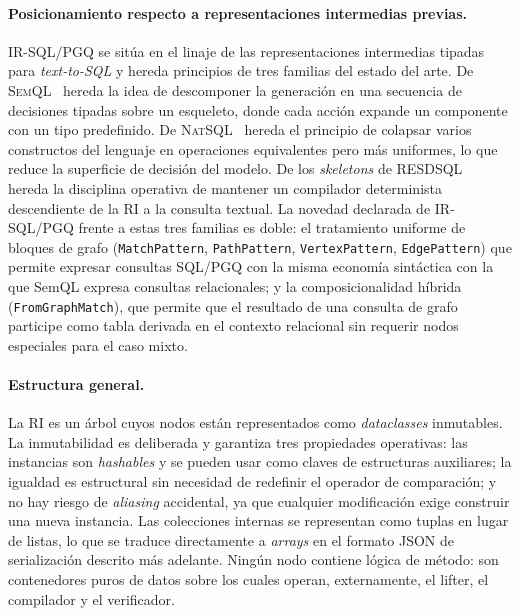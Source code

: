 \paragraph{Posicionamiento respecto a representaciones intermedias previas.} IR-SQL/PGQ se sitúa en el linaje de las representaciones intermedias tipadas para \emph{text-to-SQL} y hereda principios de tres familias del estado del arte. De \textsc{SemQL}~\cite{guo2019irnet} hereda la idea de descomponer la generación en una secuencia de decisiones tipadas sobre un esqueleto, donde cada acción expande un componente con un tipo predefinido. De \textsc{NatSQL}~\cite{gan2021natsql} hereda el principio de colapsar varios constructos del lenguaje en operaciones equivalentes pero más uniformes, lo que reduce la superficie de decisión del modelo. De los \emph{skeletons} de \textsc{RESDSQL}~\cite{RESDSQL2023} hereda la disciplina operativa de mantener un compilador determinista descendiente de la \ac{RI} a la consulta textual. La novedad declarada de IR-SQL/PGQ frente a estas tres familias es doble: el tratamiento uniforme de bloques de grafo (\texttt{MatchPattern}, \texttt{PathPattern}, \texttt{VertexPattern}, \texttt{EdgePattern}) que permite expresar consultas \ac{SQL}/\ac{PGQ} con la misma economía sintáctica con la que SemQL expresa consultas relacionales; y la composicionalidad híbrida (\texttt{FromGraphMatch}), que permite que el resultado de una consulta de grafo participe como tabla derivada en el contexto relacional sin requerir nodos especiales para el caso mixto.

\paragraph{Estructura general.} La \ac{RI} es un árbol cuyos nodos están representados como \emph{dataclasses} inmutables. La inmutabilidad es deliberada y garantiza tres propiedades operativas: las instancias son \emph{hashables} y se pueden usar como claves de estructuras auxiliares; la igualdad es estructural sin necesidad de redefinir el operador de comparación; y no hay riesgo de \emph{aliasing} accidental, ya que cualquier modificación exige construir una nueva instancia. Las colecciones internas se representan como tuplas en lugar de listas, lo que se traduce directamente a \emph{arrays} en el formato JSON de serialización descrito más adelante. Ningún nodo contiene lógica de método: son contenedores puros de datos sobre los cuales operan, externamente, el lifter, el compilador y el verificador.

